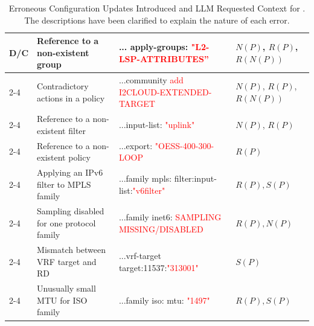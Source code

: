 \begin{table}[tb]
{\begin{tabular}{|l|l|l|l|}
\multirow{8}{*}{\textbf{D/C}}  
& Reference to a non-existent group & ... apply-groups: \textcolor{red}{"L2-LSP-ATTRIBUTES”} & \( N(P) \), \( R(P) \), \( R(N(P)) \) \\ \cline{2-4}
& Contradictory actions in a policy & ...community \textcolor{red}{add I2CLOUD-EXTENDED-TARGET}  & \( N(P) \), \( R(P) \), \( R(N(P)) \) \\ \cline{2-4}
& Reference to a non-existent filter & ...input-list: \textcolor{red}{"uplink"} & \( N(P) \), \( R(P) \)  \\ \cline{2-4}
& Reference to a non-existent policy & ...export: \textcolor{red}{"OESS-400-300-LOOP} & \( R(P) \)  \\ \cline{2-4}
& Applying an IPv6 filter to MPLS family & ...family mpls: filter:input-list:\textcolor{red}{"v6filter"} & \( R(P), S(P) \)  \\ \cline{2-4}
& Sampling disabled for one protocol family & ...family inet6: \textcolor{red}{SAMPLING MISSING/DISABLED}& \( R(P), N(P) \)  \\ \cline{2-4}
& Mismatch between VRF target and RD & ...vrf-target target:11537:\textcolor{red}{"313001"}& \( S(P) \)  \\ \cline{2-4}
& Unusually small MTU for ISO family & ...family iso: mtu: \textcolor{red}{"1497"}& \( R(P), S(P) \)  \\ \hline
\end{tabular}}
\caption{Erroneous Configuration Updates Introduced and LLM Requested Context for \sysname{}. The descriptions have been clarified to explain the nature of each error.}
\label{tab:syn_configs}
\end{table}






